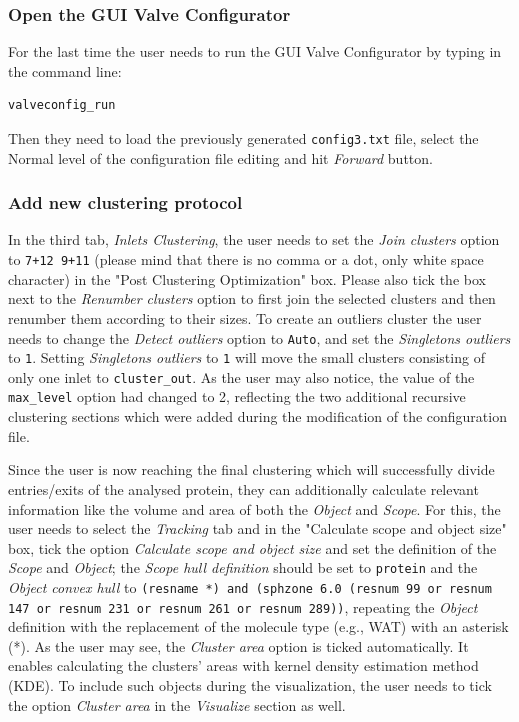 \documentclass[9pt,tutorial]{livecoms}
\begin{document}
\subsubsection{Open the GUI Valve Configurator}
For the last time the user needs to run the GUI Valve Configurator by typing in the command line:
\begin{lstlisting}
valveconfig_run
\end{lstlisting}
Then they need to load the previously generated \texttt{config3.txt} file, select the Normal level of the configuration file editing and hit \textit{Forward} button. 

\subsubsection{Add new clustering protocol}
In the third tab, \textit{Inlets Clustering}, the user needs to set the \emph{Join clusters} option to \texttt{7+12 9+11} (please mind that there is no comma or a dot, only white space character) in the "Post Clustering Optimization" box. Please also tick the box next to the \emph{Renumber clusters} option to first join the selected clusters and then renumber them according to their sizes. To create an outliers cluster the user needs to change the \emph{Detect outliers} option to \texttt{Auto}, and set the \emph{Singletons outliers} to \texttt{1}. Setting \emph{Singletons outliers} to \texttt{1} will move the small clusters consisting of only one inlet to \texttt{cluster\_out}. As the user may also notice, the value of the \texttt{max\_level} option had changed to 2, reflecting the two additional recursive clustering sections which were added during the modification of the configuration file. 

Since the user is now reaching the final clustering which will successfully divide entries/exits of the analysed protein, they can additionally calculate relevant information like the volume and area of both the \textit{Object} and \textit{Scope}. For this, the user needs to select the \textit{Tracking} tab and in the "Calculate scope and object size" box, tick the option \textit{Calculate scope and object size} and set the definition of the \textit{Scope} and \textit{Object}; the \textit{Scope hull definition} should be set to \texttt{protein} and the \textit{Object convex hull} to \texttt{(resname *) and (sphzone 6.0 (resnum 99 or resnum 147 or resnum 231 or resnum 261 or resnum 289))}, repeating the \textit{Object} definition with the replacement of the molecule type (e.g., WAT) with an asterisk (*). As the user may see, the \textit{Cluster area} option is ticked automatically. It enables calculating the clusters’ areas with kernel density estimation method (KDE). To include such objects during the visualization, the user needs to tick the option \textit{Cluster area} in the \textit{Visualize} section as well. 
\end{document}
